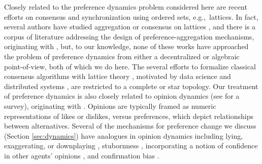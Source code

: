 \documentclass[conference]{ieeeconf}
\begin{document}


Closely related to the preference dynamics problem considered here are recent efforts on consensus \cite{riess2022} and synchronization \cite{riess2023} using ordered sets, e.g.,~lattices. In fact, several authors have studied aggregation or consensus on lattices \cite{karacal2017,chambers2011}, and there is a corpus of literature addressing the design of preference-aggregation mechanisms, originating with \cite{arrow2012}, but, to our knowledge, none of these works have approached the problem of preference dynamics from either a decentralized or algebraic point-of-view, both of which we do here. The several efforts to formalize classical consensus algorithms with lattice theory \cite{barthelemy1991}, motivated by data science \cite{jeanpierre1986} and distributed systems \cite{attiya1995}, are restricted to a complete or star topology. Our treatment of preference dynamics is also closely related to opinion dynamics (see \cite{noorazar2020} for a survey), originating with \cite{degroot1974}. Opinions are typically framed as numeric representations of likes or dislikes, versus preferences, which depict relationships between alternatives. Several of the mechanisms for preference change we discuss (Section \ref{sec:dynamics}) have analogues in opinion dynamics including  lying, exaggerating, or downplaying \cite{hansen2021}, stubornness \cite{ghaderi2014}, incorporating a notion of confidence in other agents' opinions \cite{hegselmann2002,blondel2009}, and confirmation bias \cite{hayhoe2017}.
\end{document}
